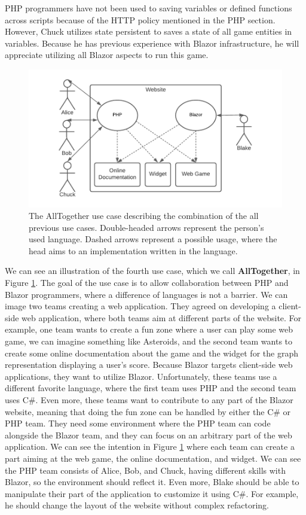 PHP programmers have not been used to saving variables or defined functions across scripts because of the HTTP policy mentioned in the PHP section.
However, Chuck utilizes state persistent to saves a state of all game entities in variables.
Because he has previous experience with Blazor infrastructure, he will appreciate utilizing all Blazor aspects to run this game.
\par
\begin{figure}[t]\centering
\includegraphics[scale=0.8]{./img/UseCaseAllTogether}
\caption{The AllTogether use case describing the combination of the all previous use cases. Double-headed arrows represent the person's used language. Dashed arrows represent a possible usage, where the head aims to an implementation written in the language.}
\label{img09:usecase}
\end{figure} 
\par
We can see an illustration of the fourth use case, which we call \textbf{AllTogether}, in Figure \ref{img09:usecase}.
The goal of the use case is to allow collaboration between PHP and Blazor programmers, where a difference of languages is not a barrier.  
We can image two teams creating a web application. 
They agreed on developing a client-side web application, where both teams aim at different parts of the website.
For example, one team wants to create a fun zone where a user can play some web game, we can imagine something like Asteroids, and the second team wants to create some online documentation about the game and the widget for the graph representation displaying a user's score.
Because Blazor targets client-side web applications, they want to utilize Blazor.
Unfortunately, these teams use a different favorite language, where the first team uses PHP and the second team uses C\#.
Even more, these teams want to contribute to any part of the Blazor website, meaning that doing the fun zone can be handled by either the C\# or PHP team.
They need some environment where the PHP team can code alongside the Blazor team, and they can focus on an arbitrary part of the web application.
We can see the intention in Figure \ref{img09:usecase} where each team can create a part aiming at the web game, the online documentation, and widget.
We can see the PHP team consists of Alice, Bob, and Chuck, having different skills with Blazor, so the environment should reflect it.
Even more, Blake should be able to manipulate their part of the application to customize it using C\#. For example, he should change the layout of the website without complex refactoring. 

